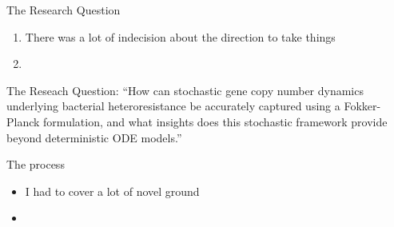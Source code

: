 \documentclass[aspectratio=169,  notheorems, sOuRcEs]{RUCPresentation}
\begin{document}
\begin{frame}{The Research Question}

    \begin{enumerate}
        \item There was a lot of indecision about the direction to take things
        \item
    \end{enumerate}

    \begin{alertblock}{The Reseach Question:}
            ``How can stochastic gene copy number dynamics underlying bacterial
            heteroresistance be accurately captured using a Fokker-Planck formulation,
            and what insights does this stochastic framework provide beyond deterministic ODE models.''
    \end{alertblock}

\end{frame}


\begin{frame}{The process}

    \begin{itemize}
        \item I had to cover a lot of novel ground
        \item
    \end{itemize}

\end{frame}
\end{document}
